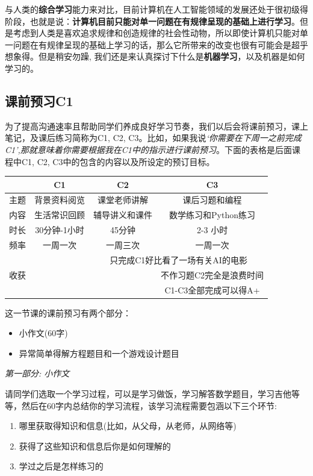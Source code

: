 \documentclass[12pt]{article}
\numberwithin{figure}{section}
\numberwithin{equation}{section}
\begin{document}
与人类的\textbf{综合学习}能力来对比，目前计算机在人工智能领域的发展还处于很初级得阶段，也就是说：\textbf{计算机目前只能对单一问题在有规律呈现的基础上进行学习}。但是考虑到人类是喜欢追求规律和创造规律的社会性动物，所以即使计算机只能对单一问题在有规律呈现的基础上学习的话，那么它所带来的改变也很有可能会是超乎想象得。但是稍安勿躁, 我们还是来认真探讨下什么是\textbf{机器学习}，以及机器是如何学习的。


\setcounter{section}{1}
\subsection{课前预习C1}

为了提高沟通速率且帮助同学们养成良好学习节奏，我们以后会将课前预习，课上笔记，及课后练习简称为C1, C2, C3。比如，如果我说\textit{`你需要在下周一之前完成C1',那就意味着你需要根据我在C1中的指示进行课前预习}。下面的表格是后面课程中C1, C2, C3中的包含的内容以及所设定的预订目标。

\begin{table}[H]
	\centering
	\renewcommand{\arraystretch}{1.6}
	\begin{tabular}{|c|c|c|c|}
		\hline
		& C1 & C2 & C3 \\
		\hline 
		主题& 背景资料阅览 & 课堂老师讲解 & 课后习题和编程 \\
		\hline
		内容& 生活常识回顾 & 辅导讲义和课件 & 数学练习和Python练习 \\
		\hline
		时长 & 30分钟-1小时 & 45分钟 & 2-3 小时 \\
		\hline 
		频率 & 一周一次 & 一周三次 & 一周一次 \\
		\hline 
		 & \checkmark & \multicolumn{2}{c|}{只完成C1好比看了一场有关AI的电影} \\
		\cline{2-4}
		收获&  \checkmark & \checkmark & 不作习题C2完全是浪费时间 \\
		\cline{2-4}
		& \checkmark & \checkmark & \checkmark C1-C3全部完成可以得A+ \\
		\hline 
	\end{tabular}
\end{table}


这一节课的课前预习有两个部分：
\begin{itemize}
	\item 小作文(60字)
	\item 异常简单得解方程题目和一个游戏设计题目
\end{itemize}

\noindent
\textit{第一部分: 小作文}

请同学们选取一个学习过程，可以是学习做饭，学习解答数学题目，学习吉他等等，然后在60字内总结你的学习流程，该学习流程需要包涵以下三个环节:
\begin{enumerate}
	\item 哪里获取得知识和信息(比如，从父母，从老师，从网络等)
	\item 获得了这些知识和信息后你是如何理解的
	\item 学过之后是怎样练习的
\end{enumerate}
\end{document}
